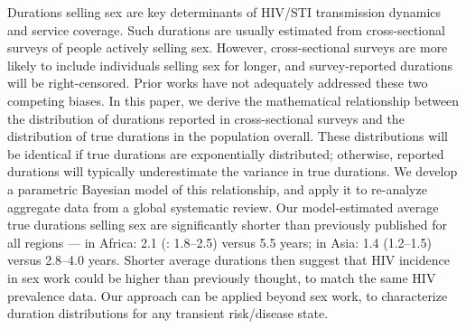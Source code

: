 Durations selling sex
are key determinants of HIV/STI transmission dynamics and service coverage.
Such durations are usually estimated from
cross-sectional surveys of people actively selling sex.
However, cross-sectional surveys
are more likely to include individuals selling sex for longer,
and survey-reported durations will be right-censored.
Prior works have not adequately addressed these two competing biases.
In this paper, we derive the mathematical relationship between
the distribution of durations reported in cross-sectional surveys and
the distribution of true durations in the population overall.
These distributions will be identical
if true durations are exponentially distributed;
otherwise, reported durations will typically underestimate the variance in true durations.
We develop a parametric Bayesian model of this relationship,
and apply it to re-analyze aggregate data from a global systematic review.
Our model-estimated average true durations selling sex are
significantly shorter than previously published for all regions --- \eg
in Africa: 2.1 (\CI: 1.8--2.5) versus 5.5 years;
in Asia: 1.4 (1.2--1.5) versus 2.8--4.0 years.
Shorter average durations then suggest that
HIV incidence in sex work could be higher than previously thought,
to match the same HIV prevalence data.
Our approach can be applied beyond sex work,
to characterize duration distributions for any transient risk/disease state.
